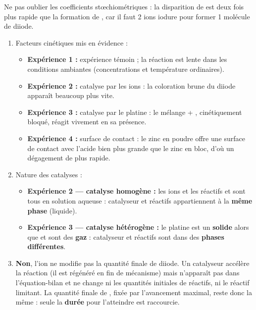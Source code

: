 \documentclass[11pt]{article}
\newcommand{\cle}[1]{{\popxbold\color{popdark}#1}}
\begin{document}
\begin{attention}
Ne pas oublier les coefficients stœchiométriques : la disparition de  est deux fois plus rapide que la formation de , car il faut 2 ions iodure pour former 1 molécule de diiode.
\end{attention}

\begin{corrige}
\begin{enumerate}
\item Facteurs cinétiques mis en évidence :
\begin{itemize}
\item \textbf{Expérience 1 :} expérience témoin ; la réaction  est lente dans les conditions ambiantes (concentrations et température ordinaires).
\item \textbf{Expérience 2 :} \cle{catalyse} par les ions  : la coloration brune du diiode apparaît beaucoup plus vite.
\item \textbf{Expérience 3 :} \cle{catalyse} par le platine : le mélange  + , cinétiquement bloqué, réagit vivement en sa présence.
\item \textbf{Expérience 4 :} \cle{surface de contact} : le zinc en poudre offre une surface de contact avec l'acide bien plus grande que le zinc en bloc, d'où un dégagement de  plus rapide.
\end{itemize}
\item Nature des catalyses :
\begin{itemize}
\item \textbf{Expérience 2 — catalyse homogène :} les ions  et les réactifs  et  sont tous en solution aqueuse : catalyseur et réactifs appartiennent à la \textbf{même phase} (liquide).
\item \textbf{Expérience 3 — catalyse hétérogène :} le platine est un \textbf{solide} alors que  et  sont des \textbf{gaz} : catalyseur et réactifs sont dans des \textbf{phases différentes}.
\end{itemize}
\item \textbf{Non}, l'ion  ne modifie pas la quantité finale de diiode. Un catalyseur accélère la réaction (il est régénéré en fin de mécanisme) mais n'apparaît pas dans l'équation-bilan et ne change ni les quantités initiales de réactifs, ni le réactif limitant. La quantité finale de , fixée par l'avancement maximal, reste donc la même : seule la \textbf{durée} pour l'atteindre est raccourcie.
\end{enumerate}
\end{corrige}
\end{document}
